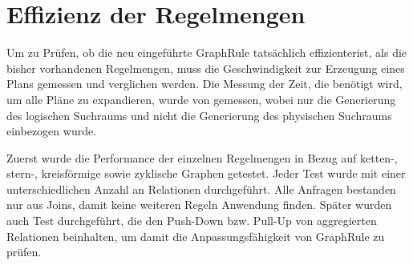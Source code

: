 \section{Effizienz der Regelmengen}

Um zu Prüfen, ob die neu eingeführte GraphRule tatsächlich effizienterist, als die bisher vorhandenen Regelmengen, muss die Geschwindigkeit zur Erzeugung eines Plans gemessen und verglichen werden. Die Messung der Zeit, die benötigt wird, um alle Pläne zu expandieren, wurde von \cite{} gemessen, wobei nur die Generierung des logischen Suchraums und nicht die Generierung des physischen Suchraums einbezogen wurde.

Zuerst wurde die Performance der einzelnen Regelmengen in Bezug auf ketten-, stern-, kreisförmige sowie zyklische  Graphen getestet. Jeder Test wurde mit einer unterschiedlichen Anzahl an Relationen durchgeführt. Alle Anfragen bestanden nur aus Joins, damit keine weiteren Regeln Anwendung finden. Später wurden auch Test durchgeführt, die den Push-Down bzw. Pull-Up von aggregierten Relationen beinhalten, um damit die Anpassungsfähigkeit von GraphRule zu prüfen.

